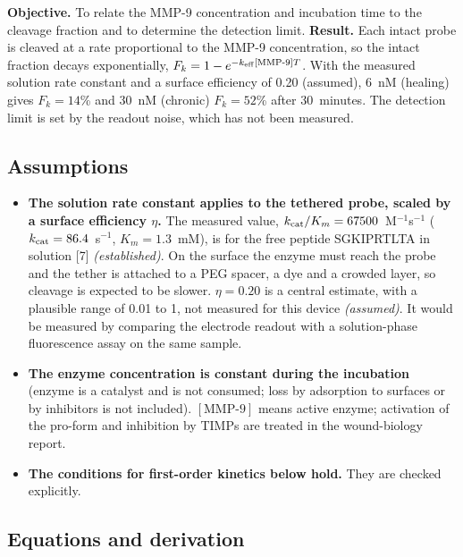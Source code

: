 \documentclass[10pt,a4paper]{article}
\numberwithin{equation}{section}
\newcommand{\cit}[1]{[#1]}
\newcommand{\Fk}{F_k}
\newcommand{\FLAG}{\textit{(assumed)}}
\newcommand{\CONF}{\textit{(established)}}
\newenvironment{assump}{\small}{\smallskip}
\newcommand{\fkChronThirty}{52}
\newcommand{\fkHealThirty}{14}
\newcommand{\kSol}{67500}
\begin{document}
\textbf{Objective.} To relate the MMP-9 concentration and incubation time to the cleavage fraction and
to determine the detection limit. \textbf{Result.} Each intact probe is cleaved at a rate proportional to the
MMP-9 concentration, so the intact fraction decays exponentially,
$\Fk=1-e^{-k_{\rm eff}[\text{MMP-9}]T}$. With the measured solution rate constant and a surface
efficiency of 0.20 (assumed), 6~nM (healing) gives $\Fk=\fkHealThirty$\% and 30~nM (chronic)
$\Fk=\fkChronThirty$\% after 30~minutes. The detection limit is set by the readout noise, which has
not been measured.

\subsection{Assumptions}

\begin{assump}
\begin{itemize}[leftmargin=*]
\item \textbf{The solution rate constant applies to the tethered probe, scaled by a surface
  efficiency $\eta$.} The measured value, $k_{\rm cat}/K_m=\kSol$~M$^{-1}$s$^{-1}$
  ($k_{\rm cat}=86.4$~s$^{-1}$, $K_m=1.3$~mM), is for the free peptide SGKIPRTLTA in solution \cit{7} \CONF. On the surface
  the enzyme must reach the probe and the tether is attached to a PEG spacer, a dye and a crowded layer, so
  cleavage is expected to be slower. $\eta=0.20$ is a central estimate, with a plausible range of 0.01 to 1,
  not measured for this device \FLAG. It would be measured by comparing the electrode readout with a
  solution-phase fluorescence assay on the same sample.
\item \textbf{The enzyme concentration is constant during the incubation} (enzyme is a catalyst and is
  not consumed; loss by adsorption to surfaces or by inhibitors is not included). $[\text{MMP-9}]$
  means active enzyme; activation of the pro-form and inhibition by TIMPs are treated in the wound-biology report.
\item \textbf{The conditions for first-order kinetics below hold.} They are checked explicitly.
\end{itemize}
\end{assump}

\subsection{Equations and derivation}
\end{document}

